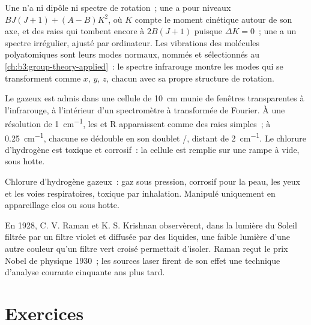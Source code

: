 Une  n'a ni dipôle ni spectre de rotation~; une  a pour niveaux $BJ(J+1) + (A - B)K^2$, où $K$ compte le moment
cinétique autour de son axe,
et des raies qui tombent encore à $2B(J+1)$ puisque $\Delta K = 0$~; une
a un spectre irrégulier, ajusté par ordinateur. Les vibrations des
molécules polyatomiques sont leurs modes normaux, nommés et sélectionnés
au
\cref{ch:b3:group-theory-applied}~: le spectre infrarouge montre les
modes qui se transforment comme $x$, $y$, $z$, chacun avec sa propre
structure de rotation.

\begin{inthelab}
Le  gazeux est admis dans une cellule de \qty{10}{cm} munie de
fenêtres transparentes à l'infrarouge, à l'intérieur d'un spectromètre à
transformée de Fourier. À une résolution de \qty{1}{cm^{-1}},
les  et R apparaissent comme des raies simples~; à
\qty{0.25}{cm^{-1}}, chacune se dédouble en son doublet
/, distant de \qty{2}{cm^{-1}}. Le chlorure
d'hydrogène est toxique et corrosif~: la cellule est remplie sur une
rampe à vide, sous hotte.
\end{inthelab}

\begin{safety}{}
Chlorure d'hydrogène gazeux~: gaz sous pression, corrosif pour la peau,
les yeux et les voies respiratoires, toxique par inhalation. Manipulé
uniquement en appareillage clos ou sous hotte.
\end{safety}

\begin{history}[Raman, 1928]
En 1928, C. V. Raman et K. S. Krishnan observèrent, dans la lumière du
Soleil filtrée par un filtre violet et diffusée par des liquides, une
faible lumière d'une autre couleur qu'un filtre vert croisé permettait
d'isoler. Raman reçut le prix Nobel de physique 1930~; les sources laser
firent de son effet une technique d'analyse courante cinquante ans plus
tard.
\end{history}

\section{Exercices}

